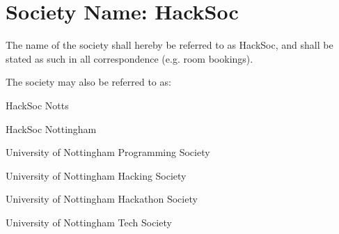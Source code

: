 \section{Society Name: HackSoc}
\begin{clause}
  The name of the society shall hereby be referred to as HackSoc, and shall be stated as such in all correspondence (e.g. room bookings).
\end{clause}

\begin{clause}
  The society may also be referred to as:
\end{clause}

\begin{subclause}
  HackSoc Notts
\end{subclause}

\begin{subclause}
  HackSoc Nottingham
\end{subclause}

\begin{subclause}
  University of Nottingham Programming Society
\end{subclause}

\begin{subclause}
  University of Nottingham Hacking Society
\end{subclause}

\begin{subclause}
  University of Nottingham Hackathon Society
\end{subclause}

\begin{subclause}
  University of Nottingham Tech Society
\end{subclause}

  
